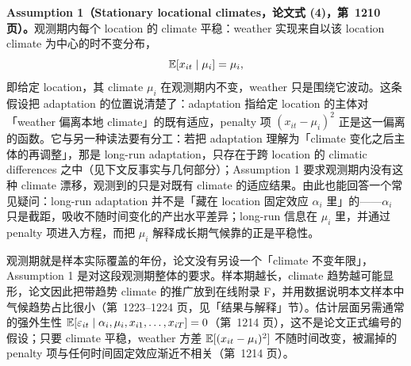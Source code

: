 \textbf{Assumption 1（Stationary locational climates，论文式 (4)，第~1210 页）。}观测期内每个 location 的 climate 平稳：weather 实现来自以该 location climate 为中心的时不变分布，
\begin{equation}
\mathbb{E}[x_{it} \mid \mu_i] = \mu_i ,
\label{eq:cca-climate}
\end{equation}
即给定 location，其 climate $\mu_i$ 在观测期内不变，weather 只是围绕它波动。这条假设把 adaptation 的位置说清楚了：adaptation 指给定 location 的主体对「weather 偏离本地 climate」的既有适应，penalty 项 $(x_{it}-\mu_i)^2$ 正是这一偏离的函数。它与另一种读法要有分工：若把 adaptation 理解为「climate 变化之后主体的再调整」，那是 long-run adaptation，只存在于跨 location 的 climatic differences 之中（见下文反事实与几何部分）；Assumption 1 要求观测期内没有这种 climate 漂移，观测到的只是对既有 climate 的适应结果。由此也能回答一个常见疑问：long-run adaptation 并不是「藏在 location 固定效应 $\alpha_i$ 里」的——$\alpha_i$ 只是截距，吸收不随时间变化的产出水平差异；long-run 信息在 $\mu_i$ 里，并通过 penalty 项进入方程，而把 $\mu_i$ 解释成长期气候靠的正是平稳性。

观测期就是样本实际覆盖的年份，论文没有另设一个「climate 不变年限」，Assumption 1 是对这段观测期整体的要求。样本期越长，climate 趋势越可能显形，论文因此把带趋势 climate 的推广放到在线附录 F，并用数据说明本文样本中气候趋势占比很小（第~1223--1224 页，见「结果与解释」节）。估计层面另需通常的强外生性 $\mathbb{E}[\varepsilon_{it}\mid \alpha_i,\mu_i,x_{i1},\dots,x_{iT}]=0$（第~1214 页），这不是论文正式编号的假设；只要 climate 平稳，weather 方差 $\mathbb{E}[(x_{it}-\mu_i)^2]$ 不随时间改变，被漏掉的 penalty 项与任何时间固定效应渐近不相关（第~1214 页）。

